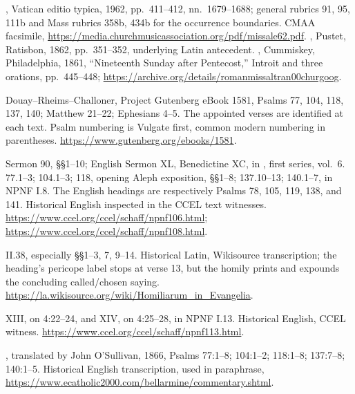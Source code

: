 \begin{description}[style=nextline,leftmargin=0pt,labelsep=0pt,itemsep=.45em]
\item[Liturgical text and historical English]
, Vatican editio typica, 1962, pp.~411--412,
nn.~1679--1688; general rubrics 91, 95, 111b and Mass rubrics 358b,
434b for the occurrence boundaries. CMAA facsimile,
\url{https://media.churchmusicassociation.org/pdf/missale62.pdf}.
, Pustet, Ratisbon, 1862, pp.~351--352,
underlying Latin antecedent.
, Cummiskey, Philadelphia, 1861, ``Nineteenth Sunday
after Pentecost,'' Introit and three orations, pp.~445--448;
\url{https://archive.org/details/romanmissaltran00churgoog}.

\item[Scripture]
Douay--Rheims--Challoner, Project Gutenberg eBook 1581,
Psalms 77, 104, 118, 137, 140; Matthew 21--22; Ephesians 4--5.
The appointed verses are identified at each text. Psalm numbering
is Vulgate first, common modern numbering in parentheses.
\url{https://www.gutenberg.org/ebooks/1581}.

\item[Augustine]
Sermon 90, \S\S1--10; English Sermon XL, Benedictine XC, in
, first series, vol.~6.
 77.1--3; 104.1--3; 118, opening
Aleph exposition, \S\S1--8; 137.10--13; 140.1--7, in NPNF I.8.
The English headings are respectively Psalms 78, 105, 119, 138,
and 141. Historical English inspected in the CCEL text witnesses.
\url{https://www.ccel.org/ccel/schaff/npnf106.html};
\url{https://www.ccel.org/ccel/schaff/npnf108.html}.

\item[Gregory the Great]
 II.38, especially \S\S1--3, 7,
9--14. Historical Latin, Wikisource transcription; the heading's
pericope label stops at verse 13, but the homily prints and expounds
the concluding called/chosen saying.
\url{https://la.wikisource.org/wiki/Homiliarum_in_Evangelia}.

\item[John Chrysostom]
 XIII, on 4:22--24, and XIV, on
4:25--28, in NPNF I.13. Historical English, CCEL witness.
\url{https://www.ccel.org/ccel/schaff/npnf113.html}.

\item[Robert Bellarmine]
, translated by John
O'Sullivan, 1866, Psalms 77:1--8; 104:1--2; 118:1--8;
137:7--8; 140:1--5. Historical English transcription, used in
paraphrase, \url{https://www.ecatholic2000.com/bellarmine/commentary.shtml}.


\end{description}
